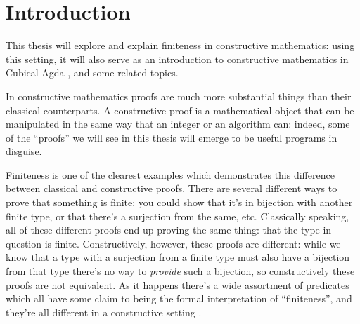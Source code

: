 \chapter{Introduction}


This thesis will explore and explain finiteness in constructive
mathematics: using this setting, it will also serve as an introduction to
constructive mathematics in Cubical Agda
\citep{vezzosiCubicalAgdaDependently2019}, and some related topics.

In constructive mathematics proofs are much more substantial things than their
classical counterparts.
A constructive proof is a mathematical object that can be manipulated in the
same way that an integer or an algorithm can: indeed, some of the ``proofs'' we
will see in this thesis will emerge to be useful programs in disguise.

Finiteness is one of the clearest examples which demonstrates this difference
between classical and constructive proofs.
There are several different ways to prove that something is finite: you could
show that it's in bijection with another finite type, or that there's a
surjection from the same, etc.
Classically speaking, all of these different proofs end up proving the same
thing: that the type in question is finite.
Constructively, however, these proofs are different: while we know that a type
with a surjection from a finite type must also have a bijection from that type
there's no way to \emph{provide} such a bijection, so constructively these
proofs are not equivalent.
As it happens there's a wide assortment of predicates which all have some claim
to being the formal interpretation of ``finiteness'', and they're all different
in a constructive setting \citep{coquandConstructivelyFinite2010}.

